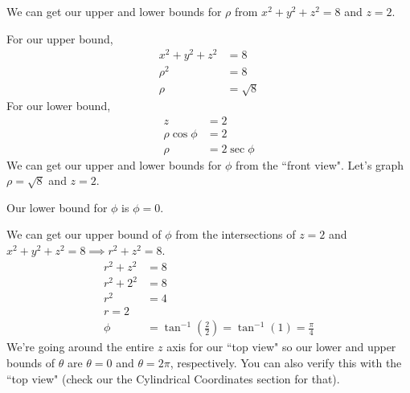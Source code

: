 \documentclass{article}
\newcommand{\lrp}[1]{\left( #1 \right)}
\begin{document}
We can get our upper and lower bounds for $\rho$ from $x^2+y^2+z^2=8$ and $z=2$.

For our upper bound,
\begin{align*}
    x^2+y^2+z^2&=8\\
    \rho^2&=8\tag{$x^2+y^2+z^2=\rho^2$ in spherical}\\
    \rho &= \sqrt{8}\tag{keep positive only}
\end{align*}
For our lower bound,
\begin{align*}
    z&=2\\
    \rho \cos \phi &= 2\tag{$z=\rho\cos\phi$ in spherical}\\
    \rho &=  2\sec\phi
\end{align*}
We can get our upper and lower bounds for $\phi$ from the ``front view". Let's graph $\rho = \sqrt{8}$ and $z=2$.
\begin{center}
\end{center}
Our lower bound for $\phi$ is $\phi =0$.

We can get our upper bound of $\phi$ from the intersections of $z=2$ and $x^2+y^2+z^2=8\implies r^2+z^2=8$.
\begin{align*}
    r^2+z^2&=8\\
    r^2+2^2&=8\\
    r^2&=4\\
    r=2\\
    \phi &= \tan^{-1}\lrp{\frac{2}{2}}=\tan^{-1}(1)=\frac{\pi}{4}
\end{align*}
We're going around the entire $z$ axis for our ``top view" so our lower and upper bounds of $\theta$ are $\theta=0$ and $\theta=2\pi$, respectively. You can also verify this with the ``top view" (check our the Cylindrical Coordinates section for that).
\end{document}
